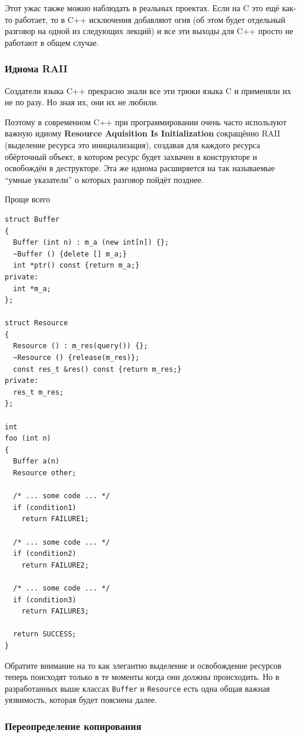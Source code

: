 \documentclass[a4paper,12pt,oneside]{article}
\begin{document}
Этот ужас также можно наблюдать в реальных проектах.
Если на C это ещё как-то работает, то в C++ исключения добавляют огня (об этом будет отдельный разговор на одной из следующих лекций) и все эти выходы для C++ просто не работают в общем случае.

\subsubsection{Идиома RAII}\label{RAII}

Создатели языка C++ прекрасно знали все эти трюки языка C и применяли их не по разу. Но зная их, они их не любили. 

Поэтому в современном C++ при программировании очень часто используют важную идиому \textbf{Resource Aquisition Is Initialization} сокращённо RAII (выделение ресурса это инициализация), создавая для каждого ресурса обёрточный объект, в котором ресурс будет захвачен в конструкторе и освобождён в деструкторе. Эта же идиома расширяется на так называемые ``умные указатели'' о которых разговор пойдёт позднее.

Проще всего

\begin{lstlisting}
struct Buffer
{
  Buffer (int n) : m_a (new int[n]) {};
  ~Buffer () {delete [] m_a;}
  int *ptr() const {return m_a;}
private:
  int *m_a;
};

struct Resource
{
  Resource () : m_res(query()) {};
  ~Resource () {release(m_res)};
  const res_t &res() const {return m_res;}
private:
  res_t m_res;
};

int
foo (int n)
{
  Buffer a(n)
  Resource other;

  /* ... some code ... */
  if (condition1)
    return FAILURE1;

  /* ... some code ... */
  if (condition2)
    return FAILURE2;

  /* ... some code ... */
  if (condition3)
    return FAILURE3;

  return SUCCESS;
}

\end{lstlisting}

Обратите внимание на то как элегантно выделение и освобождение ресурсов теперь поисходят только в те моменты когда они должны происходить. Но в разработанных выше классах \lstinline!Buffer! и \lstinline!Resource! есть одна общая важная уязвимость, которая будет пояснена далее.

\subsubsection{Переопределение копирования}\label{CopyConstr}
\end{document}
